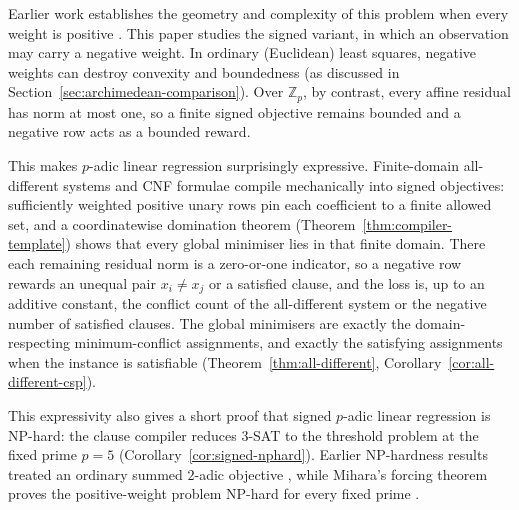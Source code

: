 \documentclass[11pt]{article}
\begin{document}
Earlier work establishes the geometry and complexity of this problem when every weight is positive \cite{baker2025padic,baker2026nphard,mihara2026forcing}. This paper studies the signed variant, in which an observation may carry a negative weight. In ordinary (Euclidean) least squares, negative weights can destroy convexity and boundedness (as discussed in Section~\ref{sec:archimedean-comparison}). Over \(\mathbb Z_p\), by contrast, every affine residual has norm at most one, so a finite signed objective remains bounded and a negative row acts as a bounded reward.

This makes \(p\)-adic linear regression surprisingly expressive. Finite-domain all-different systems and CNF formulae compile mechanically into signed objectives: sufficiently weighted positive unary rows pin each coefficient to a finite allowed set, and a coordinatewise domination theorem (Theorem~\ref{thm:compiler-template}) shows that every global minimiser lies in that finite domain. There each remaining residual norm is a zero-or-one indicator, so a negative row rewards an unequal pair \(x_i\neq x_j\) or a satisfied clause, and the loss is, up to an additive constant, the conflict count of the all-different system or the negative number of satisfied clauses. The global minimisers are exactly the domain-respecting minimum-conflict assignments, and exactly the satisfying assignments when the instance is satisfiable (Theorem~\ref{thm:all-different}, Corollary~\ref{cor:all-different-csp}).

This expressivity also gives a short proof that signed \(p\)-adic linear regression is NP-hard: the clause compiler reduces \textsc{3-SAT} to the threshold problem at the fixed prime \(p=5\) (Corollary~\ref{cor:signed-nphard}). Earlier NP-hardness results treated an ordinary summed \(2\)-adic objective \cite{baker2026nphard}, while Mihara's forcing theorem proves the positive-weight problem NP-hard for every fixed prime \cite{mihara2026forcing}.
\end{document}
